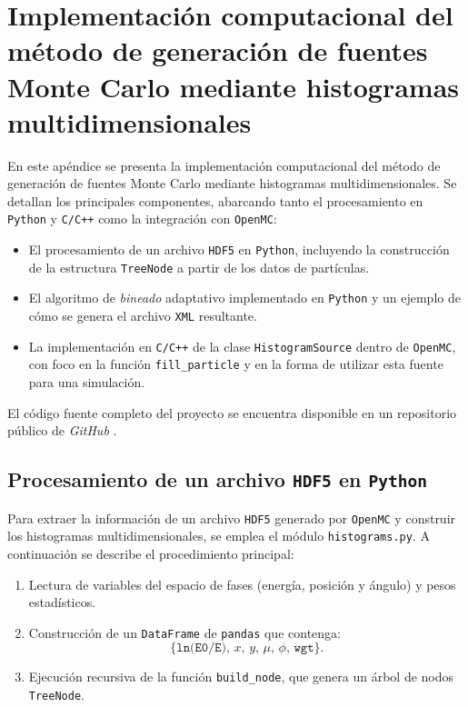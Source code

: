 \chapter{Implementación computacional del método de generación de fuentes Monte Carlo mediante histogramas multidimensionales}
\label{app:B}


En este apéndice se presenta la implementación computacional del método de generación de fuentes Monte Carlo mediante histogramas multidimensionales. Se detallan los principales componentes, abarcando tanto el procesamiento en \texttt{Python} y \texttt{C/C++} como la integración con \texttt{OpenMC}:

\begin{itemize}
    \item El procesamiento de un archivo \texttt{HDF5} en \texttt{Python}, incluyendo la construcción de la estructura \texttt{TreeNode} a partir de los datos de partículas.
    \item El algoritmo de \textit{bineado} adaptativo implementado en \texttt{Python} y un ejemplo de cómo se genera el archivo \texttt{XML} resultante.
    \item La implementación en \texttt{C/C++} de la clase \texttt{HistogramSource} dentro de \texttt{OpenMC}, con foco en la función \texttt{fill\_particle} y en la forma de utilizar esta fuente para una simulación.
\end{itemize}

\vspace{0.5em}
\noindent
El código fuente completo del proyecto se encuentra disponible en un repositorio público de \textit{GitHub} \cite{RepositorioKDSource2025} \cite{RepositorioOpenMCSource2025}.

\section{Procesamiento de un archivo \texttt{HDF5} en \texttt{Python}}\label{sec:procesamiento_h5}

Para extraer la información de un archivo \texttt{HDF5} generado por \texttt{OpenMC} y construir los histogramas multidimensionales, se emplea el módulo \texttt{histograms.py}. A continuación se describe el procedimiento principal:

\begin{enumerate}
    \item Lectura de variables del espacio de fases (energía, posición y ángulo) y pesos estadísticos.
    \item Construcción de un \texttt{DataFrame} de \texttt{pandas} que contenga:
    \[
      \{\texttt{ln(E0/E)},\, x,\, y,\, \mu,\, \phi,\, \texttt{wgt}\}.
    \]
    \item Ejecución recursiva de la función \texttt{build\_node}, que genera un árbol de nodos \texttt{TreeNode}.
\end{enumerate}

